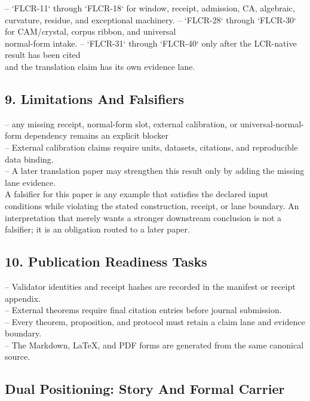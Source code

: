 \documentclass[11pt]{article}
\begin{document}
\noindent{}-- `FLCR-11` through `FLCR-18` for window, receipt, admission, CA, algebraic,\\
  curvature, residue, and exceptional machinery.
\noindent{}-- `FLCR-28` through `FLCR-30` for CAM/crystal, corpus ribbon, and universal\\
  normal-form intake.
\noindent{}-- `FLCR-31` through `FLCR-40` only after the LCR-native result has been cited\\
  and the translation claim has its own evidence lane.

\subsection*{9. Limitations And Falsifiers}

\noindent{}-- any missing receipt, normal-form slot, external calibration, or universal-normal-form dependency remains an explicit blocker\\
\noindent{}-- External calibration claims require units, datasets, citations, and reproducible data binding.\\
\noindent{}-- A later translation paper may strengthen this result only by adding the missing lane evidence.\\

A falsifier for this paper is any example that satisfies the declared input
conditions while violating the stated construction, receipt, or lane boundary.
An interpretation that merely wants a stronger downstream conclusion is not a
falsifier; it is an obligation routed to a later paper.

\subsection*{10. Publication Readiness Tasks}

\noindent{}-- Validator identities and receipt hashes are recorded in the manifest or receipt appendix.\\
\noindent{}-- External theorems require final citation entries before journal submission.\\
\noindent{}-- Every theorem, proposition, and protocol must retain a claim lane and evidence boundary.\\
\noindent{}-- The Markdown, LaTeX, and PDF forms are generated from the same canonical source.\\

\subsection*{Dual Positioning: Story And Formal Carrier}
\end{document}
